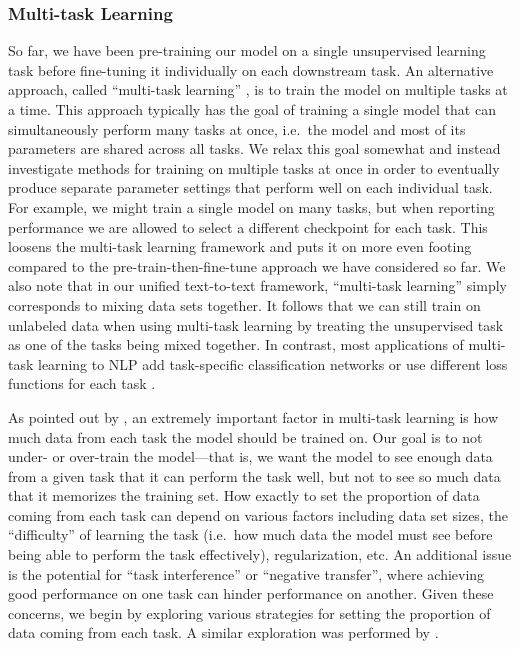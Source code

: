 \subsubsection{Multi-task Learning}
\label{sec:multitask}

So far, we have been pre-training our model on a single unsupervised learning task before fine-tuning it individually on each downstream task. An alternative approach, called ``multi-task learning'' \citep{ruder2017overview,caruana1997multitask}, is to train the model on multiple tasks at a time. This approach typically has the goal of training a single model that can simultaneously perform many tasks at once, i.e.\ the model and most of its parameters are shared across all tasks. We relax this goal somewhat and instead investigate methods for training on multiple tasks at once in order to eventually produce separate parameter settings that perform well on each individual task. For example, we might train a single model on many tasks, but when reporting performance we are allowed to select a different checkpoint for each task. This loosens the multi-task learning framework and puts it on more even footing compared to the pre-train-then-fine-tune approach we have considered so far. We also note that in our unified text-to-text framework, ``multi-task learning'' simply corresponds to mixing data sets together. It follows that we can still train on unlabeled data when using multi-task learning by treating the unsupervised task as one of the tasks being mixed together. In contrast, most applications of multi-task learning to NLP add task-specific classification networks or use different loss functions for each task \citep{liu2019multi}.

As pointed out by \cite{arivazhagan2019massively}, an extremely important factor in multi-task learning is how much data from each task the model should be trained on. Our goal is to not under- or over-train the model---that is, we want the model to see enough data from a given task that it can perform the task well, but not to see so much data that it memorizes the training set. How exactly to set the proportion of data coming from each task can depend on various factors including data set sizes, the ``difficulty'' of learning the task (i.e.\ how much data the model must see before being able to perform the task effectively), regularization, etc. An additional issue is the potential for ``task interference'' or ``negative transfer'', where achieving good performance on one task can hinder performance on another. Given these concerns, we begin by exploring various strategies for setting the proportion of data coming from each task. A similar exploration was performed by \cite{wang2019can}.

